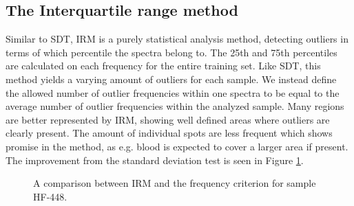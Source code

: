 \subsection{The Interquartile range method}

Similar to SDT, IRM is a purely statistical analysis method, detecting outliers in terms of which percentile the spectra belong to. The 25th and 75th percentiles are calculated on each frequency for the entire training set. Like SDT, this method yields a varying amount of outliers for each sample. We instead define the allowed number of outlier frequencies within one spectra to be equal to the average number of outlier frequencies within the analyzed sample. Many regions are better represented by IRM, showing well defined areas where outliers are clearly present. The amount of individual spots are less frequent which shows promise in the method, as e.g. blood is expected to cover a larger area if present. The improvement from the standard deviation test is seen in Figure \ref{fig:iqrHF448}.

\begin{figure}[H]

    \centering
    \qquad
    \caption{A comparison between IRM and the frequency criterion for sample HF-448.
\label{fig:iqrHF448}}%
\end{figure}

